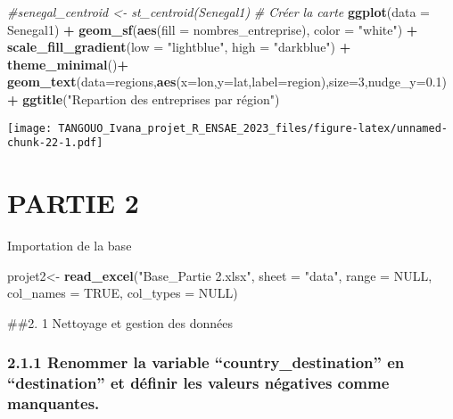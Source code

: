 \documentclass[
]{article}
\newenvironment{Shaded}{\begin{snugshade}}{\end{snugshade}}
\newcommand{\AttributeTok}[1]{\textcolor[rgb]{0.13,0.29,0.53}{#1}}
\newcommand{\CommentTok}[1]{\textcolor[rgb]{0.56,0.35,0.01}{\textit{#1}}}
\newcommand{\ConstantTok}[1]{\textcolor[rgb]{0.56,0.35,0.01}{#1}}
\newcommand{\DecValTok}[1]{\textcolor[rgb]{0.00,0.00,0.81}{#1}}
\newcommand{\FloatTok}[1]{\textcolor[rgb]{0.00,0.00,0.81}{#1}}
\newcommand{\FunctionTok}[1]{\textcolor[rgb]{0.13,0.29,0.53}{\textbf{#1}}}
\newcommand{\NormalTok}[1]{#1}
\newcommand{\OtherTok}[1]{\textcolor[rgb]{0.56,0.35,0.01}{#1}}
\newcommand{\SpecialCharTok}[1]{\textcolor[rgb]{0.81,0.36,0.00}{\textbf{#1}}}
\newcommand{\StringTok}[1]{\textcolor[rgb]{0.31,0.60,0.02}{#1}}
\begin{document}
\begin{Shaded}
\begin{Highlighting}[]
\CommentTok{\#senegal\_centroid \textless{}{-} st\_centroid(Senegal1)}
\CommentTok{\# Créer la carte}
\FunctionTok{ggplot}\NormalTok{(}\AttributeTok{data =}\NormalTok{ Senegal1) }\SpecialCharTok{+}
  \FunctionTok{geom\_sf}\NormalTok{(}\FunctionTok{aes}\NormalTok{(}\AttributeTok{fill =}\NormalTok{ nombres\_entreprise), }\AttributeTok{color =} \StringTok{"white"}\NormalTok{) }\SpecialCharTok{+}
  \FunctionTok{scale\_fill\_gradient}\NormalTok{(}\AttributeTok{low =} \StringTok{"lightblue"}\NormalTok{, }\AttributeTok{high =} \StringTok{"darkblue"}\NormalTok{) }\SpecialCharTok{+}
  \FunctionTok{theme\_minimal}\NormalTok{()}\SpecialCharTok{+}
  \FunctionTok{geom\_text}\NormalTok{(}\AttributeTok{data=}\NormalTok{regions,}\FunctionTok{aes}\NormalTok{(}\AttributeTok{x=}\NormalTok{lon,}\AttributeTok{y=}\NormalTok{lat,}\AttributeTok{label=}\NormalTok{region),}\AttributeTok{size=}\DecValTok{3}\NormalTok{,}\AttributeTok{nudge\_y=}\FloatTok{0.1}\NormalTok{)}\SpecialCharTok{+}
  \FunctionTok{ggtitle}\NormalTok{(}\StringTok{"Repartion des entreprises par région"}\NormalTok{)}
\end{Highlighting}
\end{Shaded}

\texttt{[image: TANGOUO\_Ivana\_projet\_R\_ENSAE\_2023\_files/figure-latex/unnamed-chunk-22-1.pdf]}

\hypertarget{partie-2}{%
\section{PARTIE 2}\label{partie-2}}

Importation de la base

\begin{Shaded}
\begin{Highlighting}[]
\NormalTok{projet2}\OtherTok{\textless{}{-}} \FunctionTok{read\_excel}\NormalTok{(}\StringTok{"Base\_Partie 2.xlsx"}\NormalTok{,}
                     \AttributeTok{sheet =} \StringTok{"data"}\NormalTok{,}
                     \AttributeTok{range =} \ConstantTok{NULL}\NormalTok{,}
                     \AttributeTok{col\_names =} \ConstantTok{TRUE}\NormalTok{,}
                     \AttributeTok{col\_types =} \ConstantTok{NULL}\NormalTok{) }
\end{Highlighting}
\end{Shaded}

\#\#2. 1 Nettoyage et gestion des données

\hypertarget{renommer-la-variable-country_destination-en-destination-et-duxe9finir-les-valeurs-nuxe9gatives-comme-manquantes.}{%
\subsubsection{2.1.1 Renommer la variable ``country\_destination'' en
``destination'' et définir les valeurs négatives comme
manquantes.}\label{renommer-la-variable-country_destination-en-destination-et-duxe9finir-les-valeurs-nuxe9gatives-comme-manquantes.}}
\end{document}
